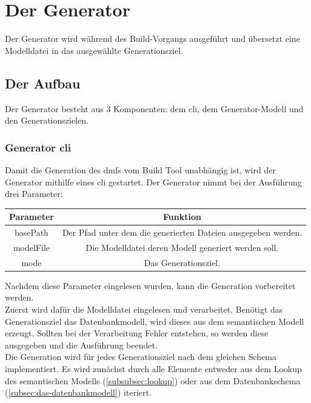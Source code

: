 \documentclass[./einleitung.tex]{subfiles}
\begin{document}
    \section{Der Generator}\label{sec:der-generator}
    Der Generator wird während des Build-Vorgangs ausgeführt und übersetzt eine Modelldatei in das ausgewählte Generationsziel.
    \subsection{Der Aufbau}
    Der Generator besteht aus 3 Komponenten: dem \acrfull{cli}, dem Generator-Modell und den Generationszielen.

    \subsubsection{Generator \acrshort{cli}}\label{subsubsec:generator-cli}
    Damit die Generation des \acrshort{dmf}s vom Build Tool unabhängig ist, wird der Generator mithilfe eines \acrshort{cli} gestartet.
    Der Generator nimmt bei der Ausführung drei Parameter:
    \begin{center}
        \begin{tabular}{|c|c|}
            \hline
            \textbf{Parameter} & \textbf{Funktion}\\
            \hline
            basePath & Der Pfad unter dem die generierten Dateien ausgegeben werden.\\
            \hline
            modelFile & Die Modelldatei deren Modell generiert werden soll.\\
            \hline
            mode & Das Generationsziel.\\
            \hline
        \end{tabular}
    \end{center}
    Nachdem diese Parameter eingelesen wurden, kann die Generation vorbereitet werden.\\
    Zuerst wird dafür die Modelldatei eingelesen und verarbeitet.
    Benötigt das Generationsziel das Datenbankmodell, wird dieses aus dem semantischen Modell erzeugt.
    Sollten bei der Verarbeitung Fehler entstehen, so werden diese ausgegeben und die Ausführung beendet.\\
    Die Generation wird für jedes Generationsziel nach dem gleichen Schema implementiert.
    Es wird zunächst durch alle Elemente entweder aus dem Lookup des semantischen Modells (\ref{subsubsec:lookup}) oder aus dem Datenbankschema (\ref{subsec:das-datenbankmodell}) iteriert.
\end{document}
